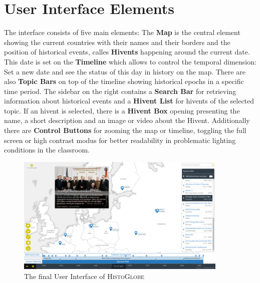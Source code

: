 \section{User Interface Elements}
The interface consists of five main elements: The \textbf{Map} is the central element showing the current countries with their names and their borders and the position of historical events, calles \textbf{Hivents} happening around the current date. This date is set on the \textbf{Timeline} which allows to control the temporal dimension: Set a new date and see the status of this day in history on the map. There are also \textbf{Topic Bars} on top of the timeline showing historical epochs in a specific time period. The sidebar on the right contains a \textbf{Search Bar} for retrieving information about historical events and a \textbf{Hivent List} for hivents of the selected topic. If an hivent is selected, there is a \textbf{Hivent Box} opening presenting the name, a short description and an image or video about the Hivent. Additionally there are \textbf{Control Buttons} for zooming the map or timeline, toggling the full screen or high contrast modus for better readability in problematic lighting conditions in the classroom.

\begin{figure}[H]
  \centering
  \includegraphics[width=0.9\textwidth]{graphics/final_ui.png}
  \caption{The final User Interface of \textsc{HistoGlobe}}
\end{figure}







